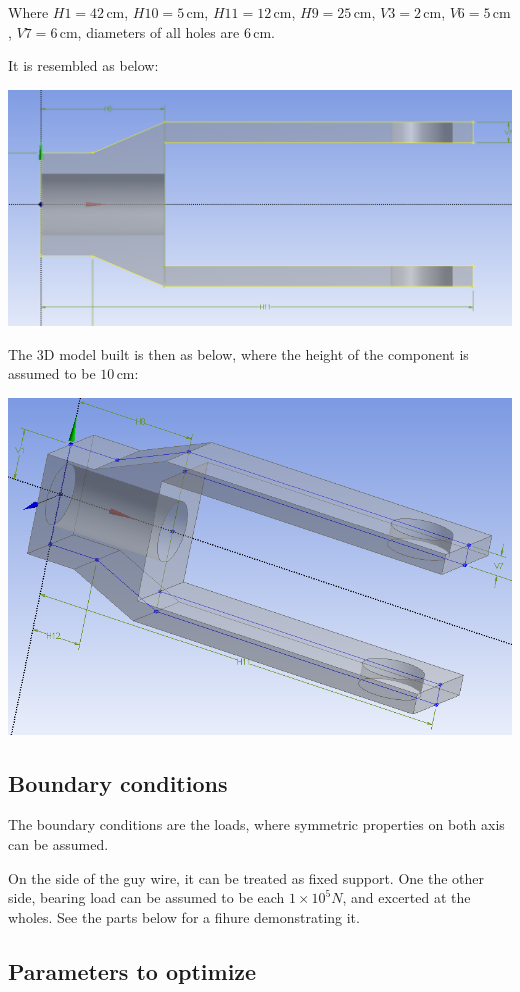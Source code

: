 \documentclass[a4paper,14pt]{extarticle}
\newcommand{\cm}{\,\si{\centi\meter}}
\begin{document}
Where $H1=42\cm$, $H10=5\cm$, $H11=12\cm$, $H9=25\cm$, $V3=2\cm$, $V6=5\cm$, $V7=6\cm$, diameters of all holes are $6\cm$.

It is resembled as below:

\includegraphics[width=\textwidth]{2D_S_01.PNG}

The 3D model built is then as below, where the height of the component is assumed to be $10 \cm$:

\includegraphics[width=\textwidth]{3D_S_01.PNG}
\subsection{Boundary conditions}
The boundary conditions are the loads, where symmetric properties on both axis can be assumed.

On the side of the guy wire, it can be treated as fixed support. One the other side, bearing load can be assumed to be each $1\times10^5 N$, and excerted at the wholes. See the parts below for a fihure demonstrating it.
\subsection{Parameters to optimize}
\end{document}
